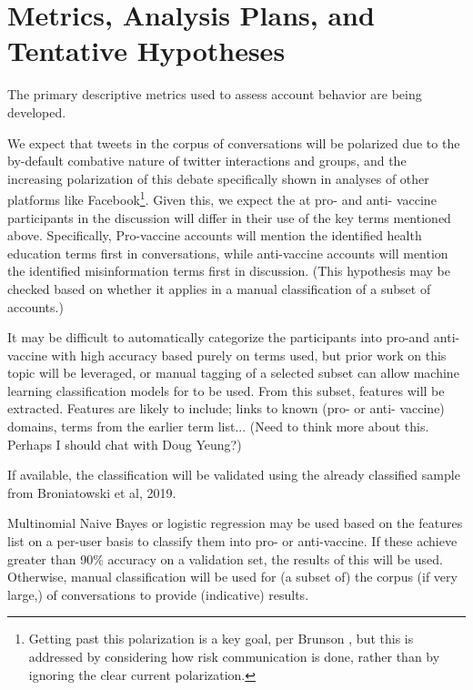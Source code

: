 \documentclass{article}
\begin{document}
\section{Metrics, Analysis Plans, and Tentative Hypotheses}

The primary descriptive metrics used to assess account behavior are being developed.

We expect that tweets in the corpus of conversations will be polarized due to the by-default combative nature of twitter interactions and groups\cite{Sunstein2002,Yardi2010}, and the increasing polarization of this debate specifically\cite{Witteman2012} shown in analyses of other platforms like Facebook\cite{Schmidt2018}\footnote{Getting past this polarization is a key goal, per Brunson \cite{Brunson2017}, but this is addressed by considering how risk communication is done, rather than by ignoring the clear current polarization.}. Given this, we expect the at pro- and anti- vaccine participants in the discussion will differ in their use of the key terms mentioned above. Specifically, Pro-vaccine accounts will mention the identified health education terms first in conversations, while anti-vaccine accounts will mention the identified misinformation terms first in discussion. (This hypothesis may be checked based on whether it applies in a manual classification of a subset of accounts.)

It may be difficult to automatically categorize the participants into pro-and anti-vaccine with high accuracy based purely on terms used, but prior work on this topic will be leveraged, or manual tagging of a selected subset can allow machine learning classification models for to be used. From this subset, features will be extracted. Features are likely to include; links to known (pro- or anti- vaccine) domains, terms from the earlier term list... (Need to think more about this. Perhaps I should chat with Doug Yeung?)

If available, the classification will be validated using the already classified sample from Broniatowski et al, 2019.

Multinomial Naive Bayes or logistic regression may be used based on the features list on a per-user basis to classify them into pro- or anti-vaccine. If these achieve greater than 90\% accuracy on a validation set, the results of this will be used. Otherwise, manual classification will be used for (a subset of) the corpus (if very large,) of conversations to provide (indicative) results.



\end{document}
